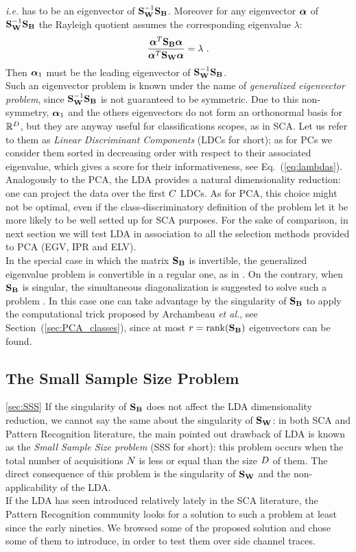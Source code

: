\textit{i.e.} has to be an eigenvector of $\SW^{-1} \SB$. Moreover for any eigenvector $\AAlpha$ of $\SW^{-1}\SB$ the Rayleigh quotient assumes the corresponding eigenvalue $\lambda$:
\begin{equation}\label{eq:lambdas}
\frac{\AAlpha^T \SB \AAlpha}{\AAlpha^T \SW \AAlpha} = \lambda \mbox{ .}
\end{equation}
Then $\AAlpha_1$ must be the leading eigenvector of $\SW^{-1} \SB$.\\
Such an eigenvector problem is known under the name of {\em generalized eigenvector problem}, since $\SW^{-1} \SB$ is not guaranteed to be symmetric. Due to this non-symmetry,  $\AAlpha_1$ and the others eigenvectors do not form an orthonormal basis for $\mathbb{R}^\traceLength$, but they are anyway useful for classifications scopes, as in SCA. Let us refer to them as {\em Linear Discriminant Components} (LDCs for short); as for PCs we consider them sorted in decreasing order with respect to their associated eigenvalue, which gives a score for their informativeness, see Eq.~(\ref{eq:lambdas}). Analogously to the PCA, the LDA provides a natural dimensionality reduction: one can project the data over the first $\newTraceLength$ LDCs. As for PCA, this choice might not be optimal, even if the class-discriminatory definition of the problem let it be more likely to be well setted up for SCA purposes. For the sake of comparison, in next section we will test LDA in association to all the selection methods provided to PCA (EGV, IPR and ELV).\\
In the special case in which the matrix $\SB$ is invertible, the generalized eigenvalue problem is convertible in a regular one, as in \cite{Standaert2008}. On the contrary, when $\SB$ is singular, the simultaneous diagonalization is suggested to solve such a problem \cite{Fukunaga}. In this case one can take advantage by the singularity of $\SB$ to apply the computational trick proposed by Archambeau \textit{et al.}, see Section~(\ref{sec:PCA_classes}), since at most $r = \mathrm{rank}(\SB)$ eigenvectors can be found.\\


\subsection{The Small Sample Size Problem}\ref{sec:SSS}
If the singularity of $\SB$ does not affect the LDA dimensionality reduction, we cannot say the same about the singularity of $\SW$: in both SCA and Pattern Recognition literature, the main pointed out drawback of LDA is known as the {\em Small Sample Size problem} (SSS for short): this problem occurs when the total number of acquisitions $\numTraces[]$ is less or equal than the size $\traceLength$ of them. The direct consequence of this problem is the singularity of $\SW$ and the non-applicability of the LDA.\\
If the LDA has seen introduced relatively lately in the SCA literature, the Pattern Recognition community looks for a solution to such a problem at least since the early nineties. We browsed some of the proposed solution and chose some of them to introduce, in order to test them over side channel traces.

